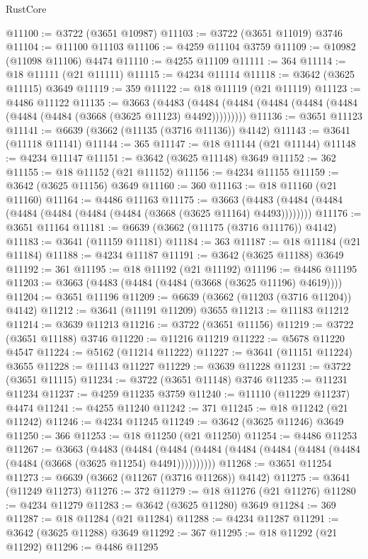 \begin{lexlean}{RustCore}
\begin{coremodule}
@11100 := @3722 (@3651 @10987)
@11103 := @3722 (@3651 @11019) @3746
@11104 := @11100 @11103
@11106 := @4259 @11104 @3759
@11109 := @10982 (@11098 @11106) @4474
@11110 := @4255 @11109
@11111 := 364
@11114 := @18 @11111 (@21 @11111)
@11115 := @4234 @11114
@11118 := @3642 (@3625 @11115) @3649
@11119 := 359
@11122 := @18 @11119 (@21 @11119)
@11123 := @4486 @11122
@11135 := @3663
    (@4483 (@4484 (@4484 (@4484 (@4484 (@4484 (@4484 (@4484 (@3668 (@3625 @11123) @4492)))))))))
@11136 := @3651 @11123
@11141 := @6639 (@3662 (@11135 (@3716 @11136)) @4142)
@11143 := @3641 (@11118 @11141)
@11144 := 365
@11147 := @18 @11144 (@21 @11144)
@11148 := @4234 @11147
@11151 := @3642 (@3625 @11148) @3649
@11152 := 362
@11155 := @18 @11152 (@21 @11152)
@11156 := @4234 @11155
@11159 := @3642 (@3625 @11156) @3649
@11160 := 360
@11163 := @18 @11160 (@21 @11160)
@11164 := @4486 @11163
@11175 := @3663 (@4483 (@4484 (@4484 (@4484 (@4484 (@4484 (@4484 (@3668 (@3625 @11164) @4493))))))))
@11176 := @3651 @11164
@11181 := @6639 (@3662 (@11175 (@3716 @11176)) @4142)
@11183 := @3641 (@11159 @11181)
@11184 := 363
@11187 := @18 @11184 (@21 @11184)
@11188 := @4234 @11187
@11191 := @3642 (@3625 @11188) @3649
@11192 := 361
@11195 := @18 @11192 (@21 @11192)
@11196 := @4486 @11195
@11203 := @3663 (@4483 (@4484 (@4484 (@3668 (@3625 @11196) @4619))))
@11204 := @3651 @11196
@11209 := @6639 (@3662 (@11203 (@3716 @11204)) @4142)
@11212 := @3641 (@11191 @11209) @3655
@11213 := @11183 @11212
@11214 := @3639 @11213
@11216 := @3722 (@3651 @11156)
@11219 := @3722 (@3651 @11188) @3746
@11220 := @11216 @11219
@11222 := @5678 @11220 @4547
@11224 := @5162 (@11214 @11222)
@11227 := @3641 (@11151 @11224) @3655
@11228 := @11143 @11227
@11229 := @3639 @11228
@11231 := @3722 (@3651 @11115)
@11234 := @3722 (@3651 @11148) @3746
@11235 := @11231 @11234
@11237 := @4259 @11235 @3759
@11240 := @11110 (@11229 @11237) @4474
@11241 := @4255 @11240
@11242 := 371
@11245 := @18 @11242 (@21 @11242)
@11246 := @4234 @11245
@11249 := @3642 (@3625 @11246) @3649
@11250 := 366
@11253 := @18 @11250 (@21 @11250)
@11254 := @4486 @11253
@11267 := @3663
    (@4483
      (@4484 (@4484 (@4484 (@4484 (@4484 (@4484 (@4484 (@4484 (@3668 (@3625 @11254) @4491))))))))))
@11268 := @3651 @11254
@11273 := @6639 (@3662 (@11267 (@3716 @11268)) @4142)
@11275 := @3641 (@11249 @11273)
@11276 := 372
@11279 := @18 @11276 (@21 @11276)
@11280 := @4234 @11279
@11283 := @3642 (@3625 @11280) @3649
@11284 := 369
@11287 := @18 @11284 (@21 @11284)
@11288 := @4234 @11287
@11291 := @3642 (@3625 @11288) @3649
@11292 := 367
@11295 := @18 @11292 (@21 @11292)
@11296 := @4486 @11295

\end{coremodule}
\end{lexlean}
